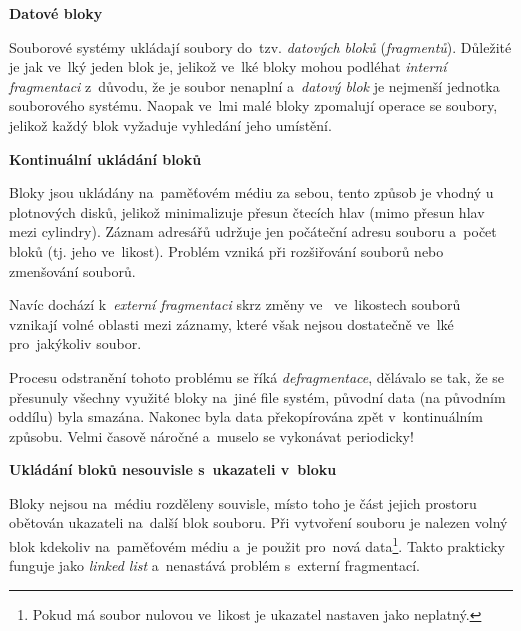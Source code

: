 \begin{Large}
    \vspace{0,5cm}
    \textbf{Datové bloky}
\end{Large}

Souborové systémy ukládají soubory do~tzv. \emph{datových bloků} (\emph{fragmentů}). Důležité je jak ve~lký jeden blok je, jelikož ve~lké bloky mohou podléhat \emph{interní fragmentaci} z~důvodu, že je soubor nenaplní a~\emph{datový blok} je nejmenší jednotka souborového systému. Naopak ve~lmi malé bloky zpomalují operace se soubory, jelikož každý blok vyžaduje vyhledání jeho umístění. 

\begin{large}
    \vspace{0,5cm}
    \textbf{Kontinuální ukládání bloků}
\end{large}

Bloky jsou ukládány na~paměťovém médiu za sebou, tento způsob je vhodný u plotnových disků, jelikož minimalizuje přesun čtecích hlav (mimo přesun hlav mezi cylindry). Záznam adresářů udržuje jen počáteční adresu souboru a~počet bloků (tj. jeho ve~likost). Problém vzniká při rozšiřování souborů nebo zmenšování souborů. 

\vspace{0,5cm}

Navíc dochází k~\emph{externí fragmentaci} skrz změny ve~ ve~likostech souborů vznikají volné oblasti mezi záznamy, 
které však nejsou dostatečně ve~lké pro~jakýkoliv soubor. 

\clearpage

Procesu odstranění tohoto problému se říká \emph{defragmentace}, dělávalo se tak, že se přesunuly všechny využité bloky na~jiné file systém, původní data (na původním oddílu) byla smazána. Nakonec byla data překopírována zpět v~kontinuálním způsobu. Velmi časově náročné a~muselo se vykonávat periodicky! 

\begin{large}
    \vspace{0,5cm}
    \textbf{Ukládání bloků nesouvisle s~ukazateli v~bloku}
\end{large}

Bloky nejsou na~médiu rozděleny souvisle, místo toho je část jejich prostoru obětován ukazateli na~další blok souboru. Při vytvoření souboru je nalezen volný blok kdekoliv na~paměťovém médiu a~je použit pro~nová data\footnote{Pokud má soubor nulovou ve~likost je ukazatel nastaven jako neplatný.}. Takto prakticky funguje jako \emph{linked list} a~nenastává problém s~externí fragmentací. 


